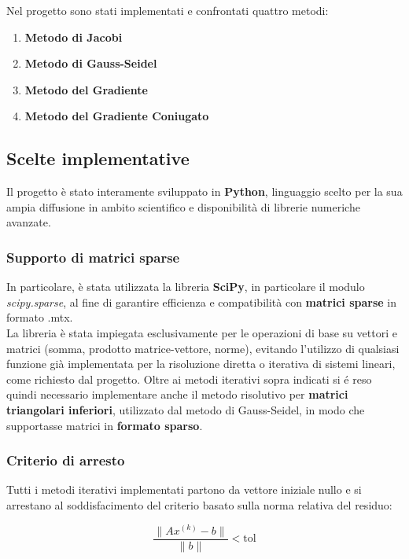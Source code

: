 Nel progetto sono stati implementati e confrontati quattro metodi:
\begin{enumerate}
    \item \textbf{Metodo di Jacobi}
    \item \textbf{Metodo di Gauss-Seidel}
    \item \textbf{Metodo del Gradiente}
    \item \textbf{Metodo del Gradiente Coniugato}
\end{enumerate}



\subsection{Scelte implementative}
Il progetto è stato interamente sviluppato in \textbf{Python}, linguaggio scelto per la sua ampia diffusione in ambito scientifico e disponibilità di librerie numeriche avanzate. 

\subsubsection{Supporto di matrici sparse}
In particolare, è stata utilizzata la libreria \textbf{SciPy}, in particolare il modulo \textit{scipy.sparse}, al fine di garantire efficienza e compatibilità con \textbf{matrici sparse} in formato .mtx.\\
La libreria è stata impiegata esclusivamente per le operazioni di base su vettori e matrici (somma, prodotto matrice-vettore, norme), evitando l’utilizzo di qualsiasi funzione già implementata per la risoluzione diretta o iterativa di sistemi lineari, come richiesto dal progetto.
Oltre ai metodi iterativi sopra indicati si é reso quindi necessario implementare anche il metodo risolutivo per \textbf{matrici triangolari inferiori}, utilizzato dal metodo di Gauss-Seidel, in modo che supportasse matrici in \textbf{formato sparso}.\\

\subsubsection{Criterio di arresto}

Tutti i metodi iterativi implementati partono da vettore iniziale nullo e si arrestano al soddisfacimento del criterio basato sulla norma relativa del residuo:

\[
\frac{\|Ax^{(k)} - b\|}{\|b\|} < \text{tol}
\]

